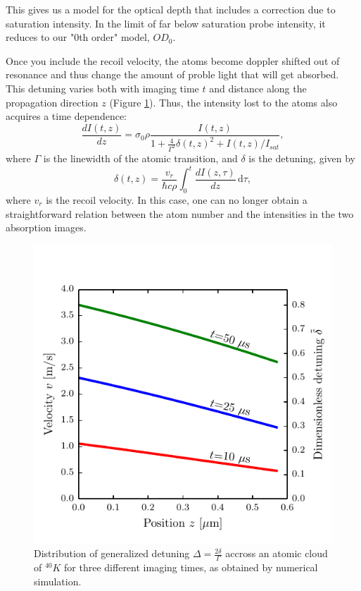 \documentclass[12pt]{iopart}
\begin{document}
 This gives us a model for the optical depth that includes a correction due to saturation intensity. In the limit of far below saturation probe intensity, it reduces to our "0th order" model, $OD_0$. 
\par Once you include the recoil velocity, the atoms become doppler shifted out of resonance and thus change the amount of proble light that will get absorbed. This detuning varies both with imaging time $t$ and distance along the propagation direction $z$ (Figure \ref{fig:detunedBlobs}). Thus, the intensity lost to the atoms also acquires a time dependence: 
\begin{equation}
\frac{dI(t,z)}{dz}=\sigma_0 \rho \frac{I(t,z)}{1+\frac{4}{\Gamma^2}\delta(t,z)^2 +I(t,z)/I_{sat}}, \label{eq3}
\end{equation}
where $\Gamma$ is the linewidth of the atomic transition, and $\delta$ is the detuning, given by 
\begin{equation}
\delta(t,z)=\frac{v_r}{\hbar c \rho}\int_0^t \frac{dI(z,\tau)}{dz}\,\mathrm{d}\tau, \label{eq4} 
\end{equation}
where  $v_r$ is the recoil velocity. In this case, one can no longer obtain a straightforward relation between the atom number and the intensities in the two absorption images.
\begin{figure}
	\includegraphics*{figure1.pdf}
\caption{Distribution of generalized detuning $\Delta=\frac{2\delta}{\Gamma}$ accross an atomic cloud of $^{40}K$ for three different imaging times, as obtained by numerical simulation.}  
\label{fig:detunedBlobs}
\end{figure}
\end{document}
